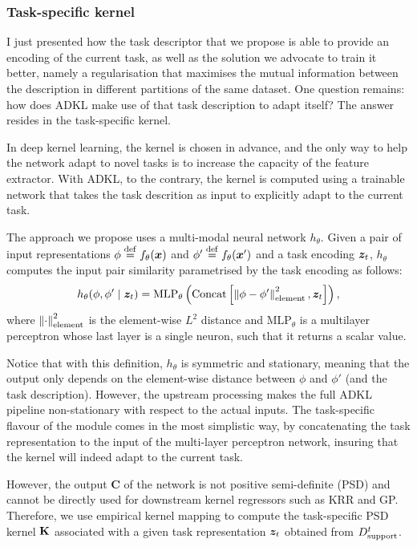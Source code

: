 \documentclass[11pt]{article}
\numberwithin{equation}{subsection}
\begin{document}
\subsubsection{Task-specific kernel}

I just presented how the task descriptor that we propose is able to provide an encoding of the current task, as well as the solution we advocate to train it better, namely a regularisation that maximises the mutual information between the description in different partitions of the same dataset. One question remains: how does ADKL make use of that task description to adapt itself? The answer resides in the task-specific kernel.

In deep kernel learning, the kernel is chosen in advance, and the only way to help the network adapt to novel tasks is to increase the capacity of the feature extractor. With ADKL, to the contrary, the kernel is computed using a trainable network that takes the task descrition as input to explicitly adapt to the current task.

The approach we propose uses a multi-modal neural network $h_\theta$. Given a pair of input representations $\phi \stackrel{\mathrm{def}}{=} f_\theta({\bm{x}})$ and $\phi' \stackrel{\mathrm{def}}{=} f_\theta({\bm{x}}')$ and a task encoding ${\bm{z}}_t$, $h_\theta$ computes the input pair similarity parametrised by the task encoding as follows:
\begin{equation}
    h_\theta(\phi, \phi' \mid {\bm{z}}_t) = \mathrm{MLP}_\theta \left( \mathrm{Concat} \left[ \left\lVert\phi - \phi'\right\rVert^2_\mathrm{element}, {\bm{z}}_t \right] \right),
\end{equation}
where $\left\lVert\cdot\right\rVert^2_\mathrm{element}$ is the element-wise $L^2$ distance and $\mathrm{MLP}_\theta$ is a multilayer perceptron whose last layer is a single neuron, such that it returns a scalar value.

Notice that with this definition, $h_\theta$ is symmetric and stationary, meaning that the output only depends on the element-wise distance between $\phi$ and $\phi'$ (and the task description). However, the upstream processing makes the full ADKL pipeline non-stationary with respect to the actual inputs.
The task-specific flavour of the module comes in the most simplistic way, by concatenating the task representation to the input of the multi-layer perceptron network, insuring that the kernel will indeed adapt to the current task.

However, the output $\mathbf{C}$ of the network is not positive semi-definite (PSD) and cannot be directly used for downstream kernel regressors such as KRR and GP.
Therefore, we use empirical kernel mapping \citep{scholkopf1999input} to compute the task-specific PSD kernel $\mathbf{K}$ associated with a given task representation ${\bm{z}}_t$ obtained from ${D_{\mathrm{support}}^t}$.
\end{document}
